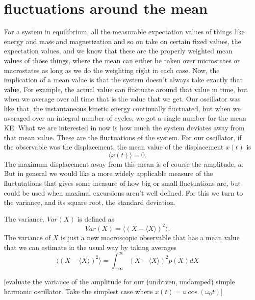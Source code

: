 \documentclass[]{revtex4}
\newcommand{\sm}[1]{{\[#1\]}}
\begin{document}
\section*{fluctuations around the mean}
For a system in equilibrium, all the measurable expectation values of things like energy and mass and magnetization and so on take on certain fixed values,
the expectation values, and we know that these are the properly weighted mean values of those things, where the mean can either be taken over microstates
or macrostates as long as we do the weighting right in each case.  Now, the implication of a mean value is that the system doesn't always take exactly that value.  For example, the actual value can fluctuate around that
value in time, but when we average over all time that is the value that we get. Our oscillator was like that, the instantaneous kinetic energy continually
fluctuated, but when we averaged over an integral number of cycles, we got a single number for the mean KE.  What we are interested in now is how much the
system deviates away from that mean value.  These are the fluctuations of the system.  For our oscillator, if the observable was the displacement, the mean
value of the displacement $x(t)$ is
\sm{\langle x(t)\rangle = 0.}
The maximum displacement away from this mean is of course the amplitude, $a$.  But in general we would like a more widely applicable measure of
the fluctutations that gives some measure of how big or small fluctuations are, but could be used when maximal excursions aren't well defined.
For this we turn to the variance, and its square root, the standard deviation.

The variance, $Var(X)$ is defined as
\[Var(X) = \langle (X - \langle X\rangle)^2\rangle.\]
The variance of $X$ is just a new macroscopic observable that has a mean value that we can estimate in the usual way by taking averages
\sm{\langle (X - \langle X\rangle)^2\rangle={\int_{-\infty}^{\infty} (X-\langle X \rangle)^2 p(X)dX}}

[evaluate the variance of the amplitude for our (undriven, undamped) simple harmonic oscillator.  Take the simplest case where $x(t)=a\cos(\omega_0 t)$]
\end{document}
